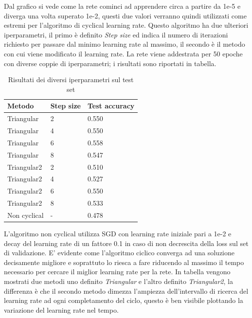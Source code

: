 \newpage
Dal grafico si vede come la rete cominci ad apprendere circa a partire da 1e-5 e diverga una volta superato 1e-2, questi due valori verranno quindi utilizzati come estremi per l'algoritmo di cyclical learning rate.
Questo algoritmo ha due ulteriori iperparametri, il primo è definito \textit{Step size} ed indica il numero di iterazioni richiesto per passare dal minimo learning rate al massimo, il secondo è il metodo con cui viene modificato il learning rate.
La rete viene addestrata per 50 epoche con diverse coppie di iperparametri; i risultati sono riportati in tabella.
\begin{table}[H]
\centering
\begin{tabular}{|l|l|l|}
\hline
Metodo       & Step size & Test accuracy \\ \hline
Triangular   & 2         & 0.550         \\ \hline
Triangular   & 4         & 0.550         \\ \hline
Triangular   & 6         & 0.558         \\ \hline
Triangular   & 8         & 0.547         \\ \hline
Triangular2  & 2         & 0.510         \\ \hline
Triangular2  & 4         & 0.527         \\ \hline
Triangular2  & 6         & 0.550         \\ \hline
Triangular2  & 8         & 0.533         \\ \hline
Non cyclical & -         & 0.478         \\ \hline
\end{tabular}
\label{t_clr}
\caption{Risultati dei diversi iperparametri sul test set}
\end{table}
L'algoritmo non cyclical utilizza SGD con learning rate iniziale pari a 1e-2 e decay del learning rate di un fattore 0.1 in caso di non decrescita della loss sul set di validazione. E' evidente come l'algoritmo ciclico converga ad una soluzione decisamente migliore e soprattuto lo riesca a fare riducendo al massimo il tempo necessario per cercare il miglior learning rate per la rete.
In tabella vengono mostrati due metodi uno definito \textit{Triangular} e l'altro definito \textit{Triangular2}, la differenza è che il secondo metodo dimezza l'ampiezza dell'intervallo di ricerca del learning rate ad ogni completamento del ciclo, questo è ben visibile plottando la variazione del learning rate nel tempo.
